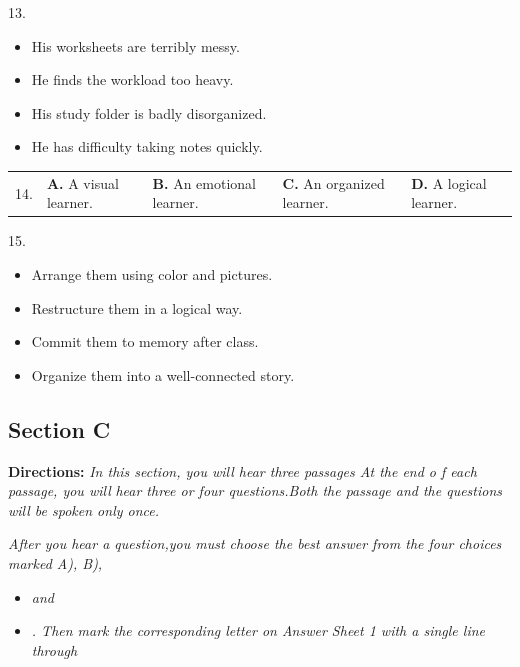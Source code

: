 \documentclass[UTF8,11pt]{ctexart}
\begin{document}
13.


\begin{itemize}[leftmargin=2em,itemsep=.2em,topsep=.4em]\item[A.] His worksheets are terribly messy.
\item[B.] He finds the workload too heavy.
\item[C.] His study folder is badly disorganized.
\item[D.] He has difficulty taking notes quickly.
\end{itemize}

\noindent\begin{tabularx}{\linewidth}{@{}lXXXX@{}}14. & \textbf{A.} A visual learner. & \textbf{B.} An emotional learner. & \textbf{C.} An organized learner. & \textbf{D.} A logical learner.\\\end{tabularx}\par

15.


\begin{itemize}[leftmargin=2em,itemsep=.2em,topsep=.4em]\item[A.] Arrange them using color and pictures.
\item[B.] Restructure them in a logical way.
\item[C.] Commit them to memory after class.
\item[D.] Organize them into a well-connected story.
\end{itemize}

\subsection*{\textbf{Section C}}


\textbf{Directions: }\textit{In this section, you will hear three passages At the end o f each passage, you will} \textit{hear three or four questions.Both the passage and the questions will be spoken only once.}


\textit{After you hear a question,you must choose the best answer from the four choices marked A), B),}


\begin{itemize}[leftmargin=2em,itemsep=.2em,topsep=.4em]\item[C.] \textit{and}
\item[D.] \textit{. Then mark the corresponding letter on Answer Sheet 1 with a single line through}
\end{itemize}
\end{document}
